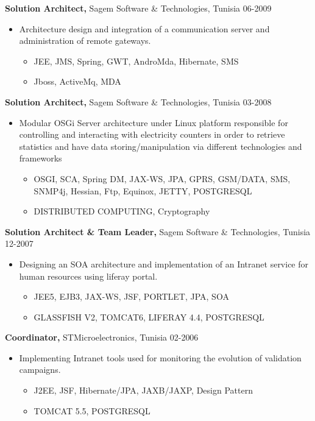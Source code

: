 \documentclass{res}
\begin{document}
\begin{resume}
{\bf Solution Architect,} Sagem Software \& Technologies, Tunisia \hfill   06-2009
\begin{itemize} \itemsep -2pt  %
\item Architecture design and integration of a communication server and administration of remote gateways.
\begin{itemize} \itemsep -2pt  %
\item JEE, JMS, Spring, GWT, AndroMda, Hibernate, SMS
\item Jboss, ActiveMq, MDA
\end{itemize}
\end{itemize}

{\bf Solution Architect,} Sagem Software \& Technologies, Tunisia \hfill   03-2008
\begin{itemize} \itemsep -2pt  %
\item Modular OSGi Server architecture under Linux platform responsible for controlling and interacting with electricity counters in order to retrieve statistics and have data storing/manipulation via different technologies and frameworks
\begin{itemize} \itemsep -2pt  %
\item OSGI, SCA, Spring DM, JAX-WS, JPA, GPRS, GSM/DATA, SMS, SNMP4j, Hessian, Ftp, Equinox, JETTY, POSTGRESQL
\item DISTRIBUTED COMPUTING, Cryptography
\end{itemize}
\end{itemize}


{\bf Solution Architect & Team Leader,} Sagem Software \& Technologies, Tunisia \hfill   12-2007
\begin{itemize} \itemsep -2pt  %
\item Designing an SOA architecture and implementation of an Intranet service for human resources using liferay portal.
\begin{itemize} \itemsep -2pt  %
\item JEE5, EJB3, JAX-WS, JSF, PORTLET, JPA, SOA
\item GLASSFISH V2, TOMCAT6, LIFERAY 4.4, POSTGRESQL
\end{itemize}
\end{itemize}


{\bf Coordinator,} STMicroelectronics, Tunisia \hfill   02-2006
\begin{itemize} \itemsep -2pt  %
\item Implementing Intranet tools used for monitoring the evolution of validation campaigns.
\begin{itemize} \itemsep -2pt  %
\item J2EE, JSF, Hibernate/JPA, JAXB/JAXP, Design Pattern
\item TOMCAT 5.5, POSTGRESQL
\end{itemize}
\end{itemize}



\end{resume}
\end{document}
